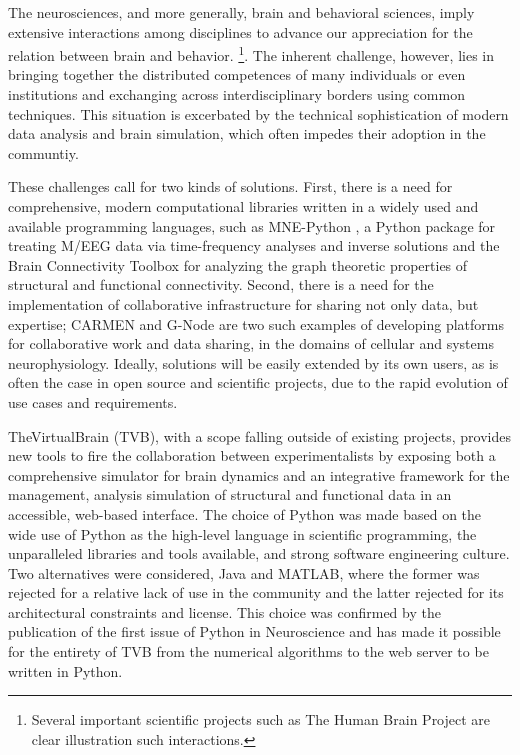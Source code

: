 The neurosciences, and more generally, brain and behavioral sciences, imply
extensive interactions among disciplines to advance our 
appreciation for the relation between brain and behavior. 
\footnote{Several important scientific projects such as The Human Brain Project are clear
illustration such interactions.}. 
The inherent challenge, however, lies in bringing together the distributed competences
of many individuals or even institutions and exchanging across interdisciplinary
borders using common techniques.  
This situation is excerbated by the technical sophistication of modern
data analysis and brain simulation, which often impedes their adoption 
in the communtiy.

These challenges call for two kinds of solutions. First, there is a need
for comprehensive, modern computational libraries written in a widely
used and available programming languages, such as MNE-Python \cite{mnepython},
a Python package for treating M/EEG data via time-frequency analyses and inverse
solutions and the Brain Connectivity
Toolbox \cite{rubinov2010complex} for analyzing the graph theoretic
properties of structural and functional connectivity. Second, there is
a need for the implementation
of collaborative infrastructure for sharing not only data, but expertise; 
CARMEN \cite{austin2011carmen} and G-Node \cite{herz2008g} are two such
examples of developing platforms for collaborative work and data sharing, 
in the domains of cellular and systems neurophysiology.
Ideally, solutions will be easily extended by its own users, as is often
the case in open source and scientific projects, due to the rapid 
evolution of use cases and requirements.

TheVirtualBrain (TVB), with a scope falling outside of existing projects,
provides new tools to fire the collaboration between experimentalists by
exposing both a comprehensive simulator for brain dynamics and an integrative 
framework for the management, analysis simulation of structural and functional
data in an accessible, web-based interface. The choice of Python was made based on
the wide use of Python as the high-level language in scientific programming, 
the unparalleled libraries and tools available, and strong software engineering 
culture.
Two alternatives were considered, Java
and MATLAB, where the former was rejected for a relative lack of use in the community
and the latter rejected for its architectural constraints and license. 
This choice was confirmed by the publication of the first issue of Python 
in Neuroscience and has made it possible for the entirety of TVB from the 
numerical algorithms to the web server to be written in Python.

